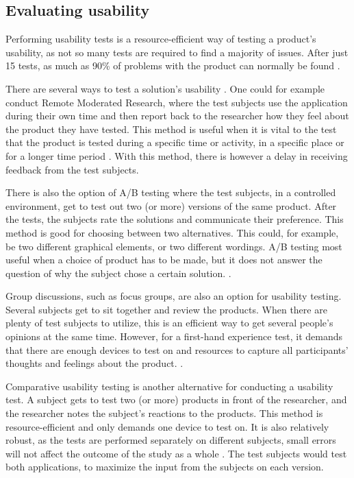 \subsection{Evaluating usability}

Performing usability tests is a resource-efficient way of testing a product's usability, as not so many tests are required to find a majority of issues. After just 15 tests, as much as 90\% of problems with the product can normally be found \cite{SixMacefield2016}.

There are several ways to test a solution’s usability \cite{MartinBella2012Umod}. One could for example conduct Remote Moderated Research, where the test subjects use the application during their own time and then report back to the researcher how they feel about the product they have tested. This method is useful when it is vital to the test that the product is tested during a specific time or activity, in a specific place or for a longer time period \cite[p.~353]{MartinBella2012Umod}. With this method, there is however a delay in receiving feedback from the test subjects. 

There is also the option of A/B testing where the test subjects, in a controlled environment, get to test out two (or more) versions of the same product. After the tests, the subjects rate the solutions and communicate their preference. This method is good for choosing between two alternatives. This could, for example, be two different graphical elements, or two different wordings. A/B testing most useful when a choice of product has to be made, but it does not answer the question of why the subject chose a certain solution. \cite[p.~12]{MartinBella2012Umod}. 

Group discussions, such as focus groups, are also an option for usability testing. Several subjects get to sit together and review the products. When there are plenty of test subjects to utilize, this is an efficient way to get several people’s opinions at the same time. However, for a first-hand experience test, it demands that there are enough devices to test on and resources to capture all participants’ thoughts and feelings about the product. \cite[p.~228]{MartinBella2012Umod}. 

Comparative usability testing is another alternative for conducting a usability test. A subject gets to test two (or more) products in front of the researcher, and the researcher notes the subject’s reactions to the products. This method is resource-efficient and only demands one device to test on. It is also relatively robust, as the tests are performed separately on different subjects, small errors will not affect the outcome of the study as a whole \cite{Ross2017}. The test subjects would test both applications, to maximize the input from the subjects on each version.

